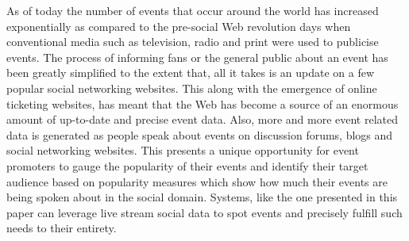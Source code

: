 \documentclass[10pt,a4paper]{article}
\begin{document}
As of today the number of events that occur around the world has increased exponentially as compared to the pre-social Web revolution days when conventional media such as television, radio and print were used to
publicise events. The process of informing fans or the general public about an event has been greatly simplified to the extent that, all it takes is an update on a few popular social networking websites. This along with the emergence of online ticketing websites, has meant that the Web has become a source of an enormous amount of up-to-date and precise event data. Also, more and more event related data is generated as people speak about events on discussion forums, blogs and social networking websites. This presents a unique opportunity for event promoters to gauge the popularity of their events and identify their target audience based on popularity measures which show how much their events are being spoken about in the social domain. Systems, like the one presented in this paper can leverage live stream social data to spot events and precisely fulfill such needs to their entirety.



\end{document}
